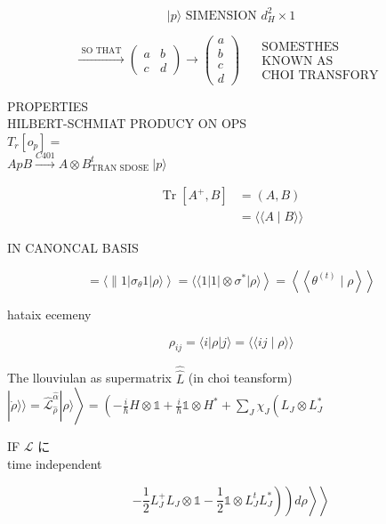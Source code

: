 \documentclass[10pt]{article}
\begin{document}
$$
|p\rangle \text { SIMENSION } d_{H}^{2} \times 1
$$

$$
\stackrel{\text { SO THAT }}{\longrightarrow}\left(\begin{array}{ll}
a & b \\
c & d
\end{array}\right) \rightarrow\left(\begin{array}{l}
a \\
b \\
c \\
d
\end{array}\right) \quad \begin{gathered}
\text { SOMESTHES } \\
\text { KNOWN AS } \\
\text { CHOI TRANSFORY }
\end{gathered}
$$

PROPERTIES\\
HILBERT-SCHMIAT PRODUCY ON OPS\\
$T_{r}\left[o_{p}\right]=$\\
$A p B \xrightarrow{C 401} A \otimes B_{\text {TRAN SDOSE }}^{t}|p\rangle$

$$
\begin{aligned}
\operatorname{Tr}\left[A^{+}, B\right] & =(A, B) \\
& =\langle\langle A \mid B\rangle\rangle
\end{aligned}
$$

IN CANONCAL BASIS

$$
\left.\left.=\langle\| 1| \sigma_{\theta} 1|\rho\rangle\right\rangle=\langle\langle 1| 1| \otimes \sigma^{*}|\rho\rangle\right\rangle=\left\langle\left\langle\theta^{(t)} \mid \rho\right\rangle\right\rangle
$$

hataix ecemeny

$$
\rho_{i j}=\langle i| \rho|j\rangle=\langle\langle i j \mid \rho\rangle\rangle
$$

The llouviulan as supermatrix $\hat{\hat{L}}$ (in choi teansform)\\
$\left.|\dot{\rho}\rangle\rangle=\hat{\mathcal{L}}_{\hat{\rho}}^{\hat{\alpha}}|\rho\rangle\right\rangle=\left(-\frac{i}{\hbar} H \otimes \mathbb{1}+\frac{i}{\hbar} \mathbb{1} \otimes H^{*}+\sum_{J} \chi_{J}\left(L_{J} \otimes L_{J}^{*}\right.\right.$

IF $\mathcal{L}$ に\\
time independent

$$
\left.\left.\left.\left.-\frac{1}{2} L_{J}^{+} L_{J} \otimes \mathbb{1}-\frac{1}{2} \mathbb{1} \otimes L_{J}^{t} L_{J}^{*}\right)\right) d \rho\right\rangle\right\rangle
$$
\end{document}

